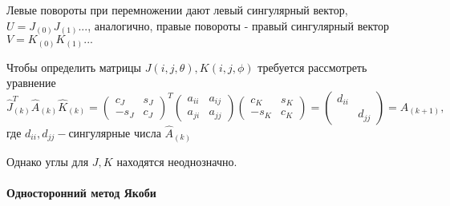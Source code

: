 \documentclass[12pt, a4paper]{report}
\theoremstyle{note}
\begin{document}
Левые повороты при перемножении дают левый сингулярный вектор, $U=J_{(0)}J_{(1)}...$, аналогично, правые повороты - правый сингулярный вектор $V=K_{(0)}K_{(1)}...$

Чтобы определить матрицы $J(i,j,\theta), K(i,j,\phi)$ требуется рассмотреть уравнение
\begin{equation}
    \hat{J}_{(k)}^T\hat{A}_{(k)}\hat{K}_{(k)} = \begin{pmatrix}
        c_J&s_J\\
        -s_J&c_J
    \end{pmatrix}^T
    \begin{pmatrix}
        a_{ii}&a_{ij}\\
        a_{ji}&a_{jj}
    \end{pmatrix}
    \begin{pmatrix}
        c_K&s_K\\
        -s_K&c_K
    \end{pmatrix} = \begin{pmatrix}
        d_{ii} &\\
        &d_{jj}
    \end{pmatrix} = A_{(k+1)},
\end{equation}
где $d_{ii}, d_{jj} -\text{сингулярные числа } \hat{A}_{(k)}$

Однако углы для $J, K$ находятся неоднозначно.
\paragraph{Односторонний метод Якоби}
\end{document}
